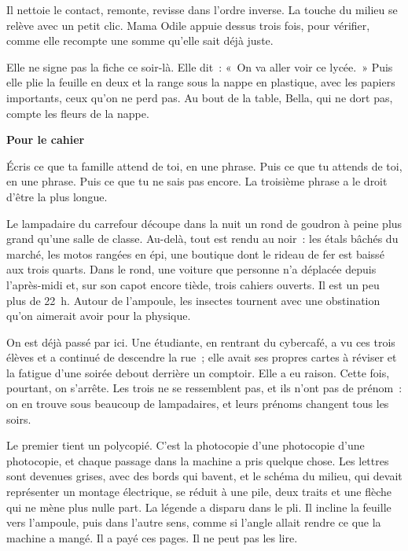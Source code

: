 \documentclass[10.5pt,twoside,openright]{book}
\newenvironment{pourcahier}[1]{\par\vspace{0.9em}\begin{tcolorbox}[colback=black!4,colframe=accent,boxrule=0pt,leftrule=2.2pt,arc=0pt,left=8pt,right=8pt,top=5pt,bottom=5pt]\small\textbf{#1}\par\smallskip}{\end{tcolorbox}\par}
\newcommand{\chapitre}[2]{\cleardoublepage\markright{#2}\thispagestyle{plain}\vspace*{2.2cm}{\noindent\color{accent}\fontsize{54}{54}\selectfont\bfseries #1}\par\vspace{0.5em}{\noindent\LARGE\bfseries #2\par}\vspace{1.6em}\noindent\ignorespaces}
\begin{document}
Il nettoie le contact, remonte, revisse dans l’ordre inverse. La touche du milieu se relève avec un petit clic. Mama Odile appuie dessus trois fois, pour vérifier, comme elle recompte une somme qu’elle sait déjà juste.

Elle ne signe pas la fiche ce soir-là. Elle dit : « On va aller voir ce lycée. » Puis elle plie la feuille en deux et la range sous la nappe en plastique, avec les papiers importants, ceux qu’on ne perd pas. Au bout de la table, Bella, qui ne dort pas, compte les fleurs de la nappe.

\begin{pourcahier}{Pour le cahier}
Écris ce que ta famille attend de toi, en une phrase. Puis ce que tu attends de toi, en une phrase. Puis ce que tu ne sais pas encore. La troisième phrase a le droit d’être la plus longue.
\end{pourcahier}


\chapitre{13}{La lampe}

Le lampadaire du carrefour découpe dans la nuit un rond de goudron à peine plus grand qu’une salle de classe. Au-delà, tout est rendu au noir : les étals bâchés du marché, les motos rangées en épi, une boutique dont le rideau de fer est baissé aux trois quarts. Dans le rond, une voiture que personne n’a déplacée depuis l’après-midi et, sur son capot encore tiède, trois cahiers ouverts. Il est un peu plus de 22 h. Autour de l’ampoule, les insectes tournent avec une obstination qu’on aimerait avoir pour la physique.

On est déjà passé par ici. Une étudiante, en rentrant du cybercafé, a vu ces trois élèves et a continué de descendre la rue ; elle avait ses propres cartes à réviser et la fatigue d’une soirée debout derrière un comptoir. Elle a eu raison. Cette fois, pourtant, on s’arrête. Les trois ne se ressemblent pas, et ils n’ont pas de prénom : on en trouve sous beaucoup de lampadaires, et leurs prénoms changent tous les soirs.

Le premier tient un polycopié. C’est la photocopie d’une photocopie d’une photocopie, et chaque passage dans la machine a pris quelque chose. Les lettres sont devenues grises, avec des bords qui bavent, et le schéma du milieu, qui devait représenter un montage électrique, se réduit à une pile, deux traits et une flèche qui ne mène plus nulle part. La légende a disparu dans le pli. Il incline la feuille vers l’ampoule, puis dans l’autre sens, comme si l’angle allait rendre ce que la machine a mangé. Il a payé ces pages. Il ne peut pas les lire.
\end{document}
